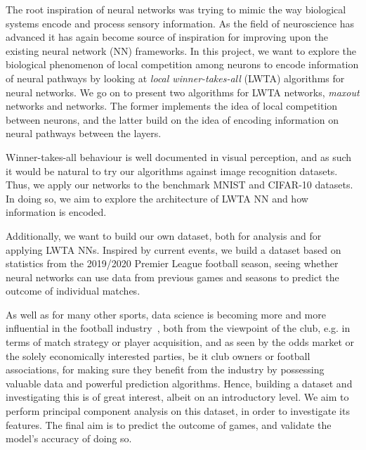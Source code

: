 The root inspiration of neural networks was trying to mimic the way biological systems encode and process sensory information. As the field of neuroscience has advanced it has again become source of inspiration for improving upon the existing neural network (NN) frameworks. In this project, we want to explore the biological phenomenon of local competition among neurons to encode information of neural pathways by looking at \textit{local winner-takes-all} (LWTA) algorithms for neural networks. We go on to present two algorithms for LWTA networks, \textit{maxout} networks and  networks. The former implements the idea of local competition between neurons, and the latter build on the idea of encoding information on neural pathways between the layers.

Winner-takes-all behaviour is well documented in visual perception, and as such it would be natural to try our algorithms against image recognition datasets. Thus, we apply our networks to the benchmark MNIST and CIFAR-10 datasets. In doing so, we aim to explore the architecture of LWTA NN and how information is encoded.

Additionally, we want to build our own dataset, both for analysis and for applying LWTA NNs. Inspired by current events, we build a dataset based on statistics from the 2019/2020 Premier League football season, seeing whether neural networks can use data from previous games and seasons to predict the outcome of individual matches.

As well as for many other sports, data science is becoming more and more influential in the football industry~\citep{Herbinet2018}, both from the viewpoint of the club, e.g. in terms of match strategy or player acquisition, and as seen by the odds market or the solely economically interested parties, be it club owners or football associations, for making sure they benefit from the industry by possessing valuable data and powerful prediction algorithms. Hence, building a dataset and investigating this is of great interest, albeit on an introductory level. We aim to perform principal component analysis on this dataset, in order to investigate its features. The final aim is to predict the outcome of games, and validate the model's accuracy of doing so. 

